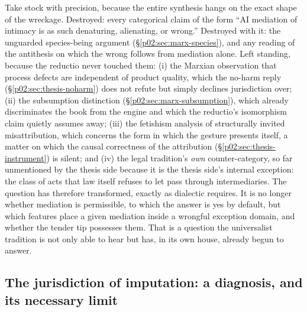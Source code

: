 \documentclass[11pt,a4paper]{article}
\begin{document}
Take stock with precision, because the entire synthesis hangs on the exact shape of the wreckage. Destroyed: every categorical claim of the form ``AI mediation of intimacy is as such denaturing, alienating, or wrong.'' Destroyed with it: the unguarded species-being argument (\S\ref{p02:sec:marx-species}), and any reading of the antithesis on which the wrong follows from mediation alone. Left standing, because the reductio never touched them: (i) the Marxian observation that process defects are independent of product quality, which the no-harm reply (\S\ref{p02:sec:thesis-noharm}) does not refute but simply declines jurisdiction over; (ii) the subsumption distinction (\S\ref{p02:sec:marx-subsumption}), which already discriminates the book from the engine and which the reductio's isomorphism claim quietly assumes away; (iii) the fetishism analysis of structurally invited misattribution, which concerns the form in which the gesture presents itself, a matter on which the causal correctness of the attribution (\S\ref{p02:sec:thesis-instrument}) is silent; and (iv) the legal tradition's \emph{own} counter-category, so far unmentioned by the thesis side because it is the thesis side's internal exception: the class of acts that law itself refuses to let pass through intermediaries. The question has therefore transformed, exactly as dialectic requires. It is no longer whether mediation is permissible, to which the answer is yes by default, but which features place a given mediation inside a wrongful exception domain, and whether the tender tip possesses them. That is a question the universalist tradition is not only able to hear but has, in its own house, already begun to answer.

\subsection{The jurisdiction of imputation: a diagnosis, and its necessary limit}
\label{p02:sec:thesis-jurisdiction}
\end{document}
